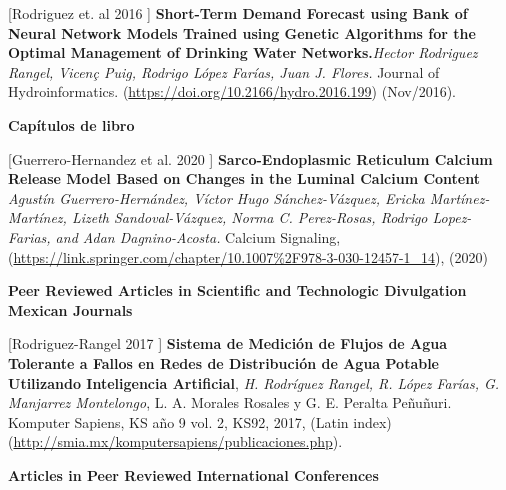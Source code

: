\documentclass[10pt]{article}
\newenvironment{innerlist}[1][\enskip\textbullet]%
        {\begin{compactitem}[#1]}{\end{compactitem}}
\newcommand{\blankline}{\quad\pagebreak[2]}
\begin{document}
\begin{innerlist}
\item [[Rodriguez et. al 2016]] \textbf{Short-Term Demand Forecast using Bank of Neural Network Models Trained using Genetic Algorithms for the Optimal Management of Drinking Water Networks.}\textit{Hector Rodriguez Rangel, Vicen\c{c} Puig, Rodrigo López Farías, Juan J. Flores.}  {Journal of Hydroinformatics}. (\url{https://doi.org/10.2166/hydro.2016.199}) (Nov/2016).

\blankline

\textbf{Capítulos de libro}

\blankline

\item [[Guerrero-Hernandez et al. 2020]] \textbf{Sarco-Endoplasmic Reticulum Calcium Release Model Based on Changes in the Luminal Calcium Content} \textit{Agustín Guerrero-Hernández, Víctor Hugo Sánchez-Vázquez,
Ericka Martínez-Martínez, Lizeth Sandoval-Vázquez, Norma C. Perez-Rosas, Rodrigo Lopez-Farias, and Adan Dagnino-Acosta.} {Calcium Signaling},  (\url{https://link.springer.com/chapter/10.1007\%2F978-3-030-12457-1_14}), (2020)



\end{innerlist}
\blankline

\textbf{Peer Reviewed Articles in Scientific and Technologic Divulgation Mexican Journals }


\blankline



\begin{innerlist}


\item [[Rodriguez-Rangel 2017]] \textbf{Sistema de Medición de Flujos de Agua Tolerante a Fallos en Redes de Distribución de Agua Potable Utilizando Inteligencia Artificial}, \textit{H. Rodríguez Rangel, R. López Farías, G. Manjarrez Montelongo}, L. A. Morales Rosales y G. E. Peralta Peñuñuri. Komputer Sapiens, KS año 9 vol. 2, KS92, 2017, (Latin index) (\url{http://smia.mx/komputersapiens/publicaciones.php}).

\end{innerlist}

\blankline



\textbf{Articles in Peer Reviewed International Conferences}

\blankline




\blankline
\end{document}
